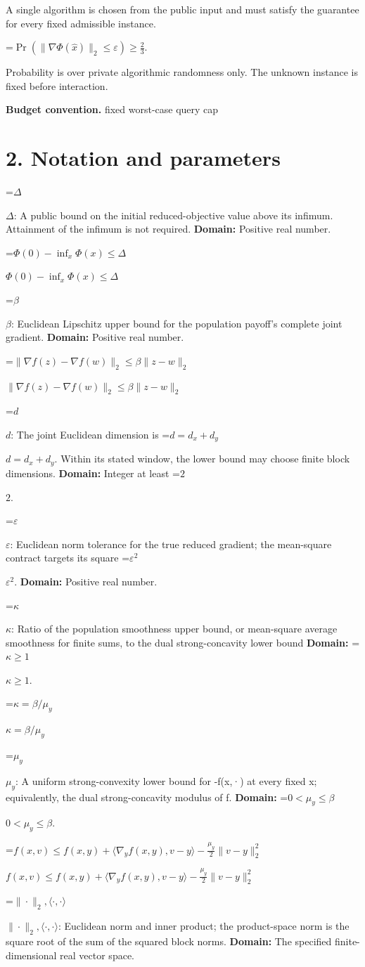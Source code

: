 \documentclass[10pt,a4paper]{article}
\newcommand{\AtlasMath}[1]{\par\begingroup\centering\setbox0=\hbox{$\displaystyle #1$}\ifdim\wd0>1.4\linewidth\typeout{ATLAS WIDE FORMULA: \the\wd0}\fi\ifdim\wd0>\linewidth\resizebox{\linewidth}{!}{\box0}\else\box0\fi\par\endgroup}
\newcommand{\AtlasInlineMath}[1]{\begingroup\setbox0=\hbox{$#1$}\ifdim\wd0>.4\linewidth\endgroup\AtlasMath{#1}\else\endgroup$#1$\fi}
\begin{document}
A single algorithm is chosen from the public input and must satisfy the guarantee for every fixed admissible instance.


\AtlasMath{\Pr\!\left(\|\nabla\Phi(\widehat{x})\|_2\le\varepsilon\right)\ge\frac23.}


Probability is over private algorithmic randomness only. The unknown instance is fixed before interaction.

\textbf{Budget convention.} fixed worst-case query cap

\section{2. Notation and parameters}
\AtlasInlineMath{\Delta}: A public bound on the initial reduced-objective value above its infimum. Attainment of the infimum is not required. \textbf{Domain:} Positive real number.

\AtlasInlineMath{\Phi(0)-\inf_x\Phi(x)\le\Delta}

\AtlasInlineMath{\beta}: Euclidean Lipschitz upper bound for the population payoff's complete joint gradient. \textbf{Domain:} Positive real number.

\AtlasInlineMath{\|\nabla f(z)-\nabla f(w)\|_2\le\beta\|z-w\|_2}

\AtlasInlineMath{d}: The joint Euclidean dimension is \AtlasInlineMath{d=d_x+d_y}. Within its stated window, the lower bound may choose finite block dimensions. \textbf{Domain:} Integer at least \AtlasInlineMath{2}.

\AtlasInlineMath{\varepsilon}: Euclidean norm tolerance for the true reduced gradient; the mean-square contract targets its square \AtlasInlineMath{\varepsilon^2}. \textbf{Domain:} Positive real number.

\AtlasInlineMath{\kappa}: Ratio of the population smoothness upper bound, or mean-square average smoothness for finite sums, to the dual strong-concavity lower bound \textbf{Domain:} \AtlasInlineMath{\kappa\ge1}.

\AtlasInlineMath{\kappa=\beta/\mu_y}

\AtlasInlineMath{\mu_y}: A uniform strong-convexity lower bound for -f(x,·) at every fixed x; equivalently, the dual strong-concavity modulus of f. \textbf{Domain:} \AtlasInlineMath{0<\mu_y\le\beta}.

\AtlasInlineMath{f(x,v)\le f(x,y)+\langle\nabla_yf(x,y),v-y\rangle-\frac{\mu_y}{2}\|v-y\|_2^2}

\AtlasInlineMath{\|\cdot\|_2,\langle\cdot,\cdot\rangle}: Euclidean norm and inner product; the product-space norm is the square root of the sum of the squared block norms. \textbf{Domain:} The specified finite-dimensional real vector space.
\end{document}
